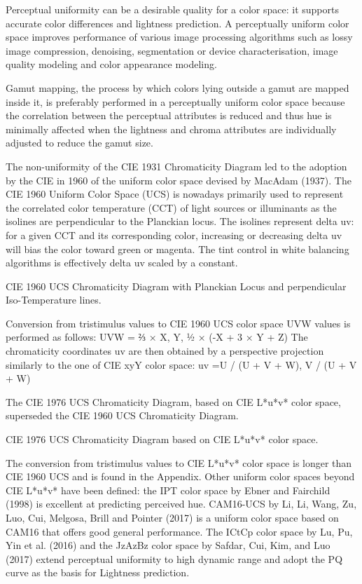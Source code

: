 Perceptual uniformity can be a desirable quality for a color space: it supports accurate color differences and lightness prediction. A perceptually uniform color space improves performance of various image processing algorithms such as lossy image compression, denoising, segmentation or device characterisation, image quality modeling and color appearance modeling.

Gamut mapping, the process by which colors lying outside a gamut are mapped inside it, is preferably performed in a perceptually uniform color space because the correlation between the perceptual attributes is reduced and thus hue is minimally affected when the lightness and chroma attributes are individually adjusted to reduce the gamut size.

The non-uniformity of the CIE 1931 Chromaticity Diagram led to the adoption by the CIE in 1960 of the uniform color space devised by MacAdam (1937). The CIE 1960 Uniform Color Space (UCS) is nowadays primarily used to represent the correlated color temperature (CCT) of light sources or illuminants as the isolines are perpendicular to the Planckian locus. The isolines represent delta uv: for a given CCT and its corresponding color, increasing or decreasing delta uv will bias the color toward green or magenta. The tint control in white balancing algorithms is effectively delta uv scaled by a constant.
 
CIE 1960 UCS Chromaticity Diagram with Planckian Locus and perpendicular Iso-Temperature lines.

Conversion from tristimulus values to CIE 1960 UCS color space UVW values is performed as follows:
UVW = ⅔ × X, Y, ½ × (-X + 3 × Y + Z)
The chromaticity coordinates uv are then obtained by a perspective projection similarly to the one of CIE xyY color space:
uv =U / (U + V + W), V / (U + V + W)

The CIE 1976 UCS Chromaticity Diagram, based on CIE L*u*v* color space, superseded the CIE 1960 UCS Chromaticity Diagram.

CIE 1976 UCS Chromaticity Diagram based on CIE L*u*v* color space.

The conversion from tristimulus values to CIE L*u*v* color space is longer than CIE 1960 UCS and is found in the Appendix.
Other uniform color spaces beyond CIE L*u*v* have been defined: the IPT color space by Ebner and Fairchild (1998) is excellent at predicting perceived hue. CAM16-UCS by Li, Li, Wang, Zu, Luo, Cui, Melgosa, Brill and Pointer (2017) is a uniform color space based on CAM16 that offers good general performance. The ICtCp color space by Lu, Pu, Yin et al. (2016) and the JzAzBz color space by Safdar, Cui, Kim, and Luo (2017) extend perceptual uniformity to high dynamic range and adopt the PQ curve as the basis for Lightness prediction.

